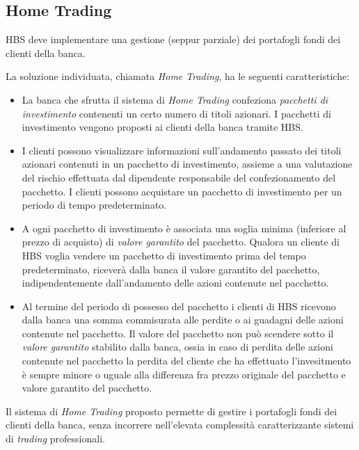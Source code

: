 
\subsection{Home Trading}

HBS deve implementare una gestione (seppur parziale) dei portafogli fondi dei clienti della banca.

La soluzione individuata, chiamata \emph{Home Trading}, ha le seguenti caratteristiche:
\begin{itemize}
	\item La banca che sfrutta il sistema di \emph{Home Trading} confeziona \emph{pacchetti di investimento} contenenti un certo numero di titoli azionari.
	I pacchetti di investimento vengono proposti ai clienti della banca tramite HBS.
	\item I clienti possono visualizzare informazioni sull'andamento passato dei titoli azionari contenuti in un pacchetto di investimento, assieme a una valutazione del rischio effettuata dal dipendente responsabile del confezionamento del pacchetto.
	I clienti possono acquistare un pacchetto di investimento per un periodo di tempo predeterminato.
	\item A ogni pacchetto di investimento \`e associata una soglia minima (inferiore al prezzo di acquisto) di \emph{valore garantito} del pacchetto.
	Qualora un cliente di HBS voglia vendere un pacchetto di investimento prima del tempo predeterminato, ricever\`a dalla banca il valore garantito del pacchetto, indipendentemente dall'andamento delle azioni contenute nel pacchetto.
	\item Al termine del periodo di possesso del pacchetto i clienti di HBS ricevono dalla banca una somma commisurata alle perdite o ai guadagni delle azioni contenute nel pacchetto.
	Il valore del pacchetto non pu\`o scendere sotto il \emph{valore garantito} stabilito dalla banca, ossia in caso di perdita delle azioni contenute nel pacchetto la perdita del cliente che ha effettuato l'invesitmento \`e sempre minore o uguale alla differenza fra prezzo originale del pacchetto e valore garantito del pacchetto.
\end{itemize}

Il sistema di \emph{Home Trading} proposto permette di gestire i portafogli fondi dei clienti della banca, senza incorrere nell'elevata complessit\`a caratterizzante sistemi di \emph{trading} professionali.
